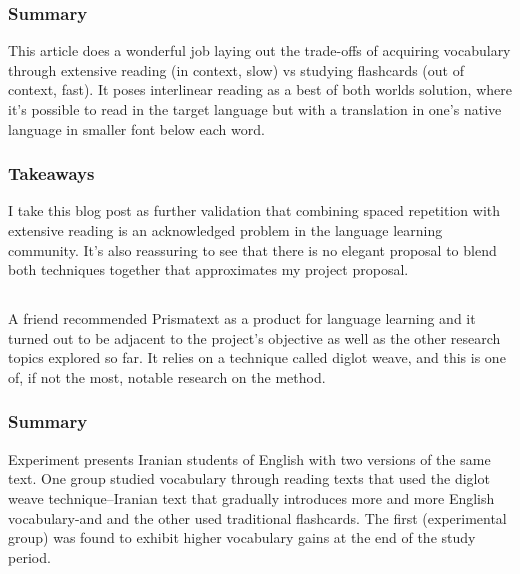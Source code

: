 \documentclass[
	letterpaper, %
]{jdf}
\begin{document}
\subsubsection{Summary}
This article does a wonderful job laying out the trade-offs of acquiring vocabulary through extensive reading (in context, slow) vs studying flashcards (out of context, fast). It poses interlinear reading as a best of both worlds solution, where it's possible to read in the target language but with a translation in one's native language in smaller font below each word.

\subsubsection{Takeaways}
I take this blog post as further validation that combining spaced repetition with extensive reading is an acknowledged problem in the language learning community. It's also reassuring to see that there is no elegant proposal to blend both techniques together that approximates my project proposal.

\subsection{}
A friend recommended Prismatext as a product for language learning and it turned out to be adjacent to the project's objective as well as the other research topics explored so far. It relies on a technique called diglot weave, and this is one of, if not the most, notable research on the method.

\subsubsection{Summary}
Experiment presents Iranian students of English with two versions of the same text. One group studied vocabulary through reading texts that used the diglot weave technique–Iranian text that gradually introduces more and more English vocabulary-and and the other used traditional flashcards. The first (experimental group) was found to exhibit higher vocabulary gains at the end of the study period.
\end{document}
